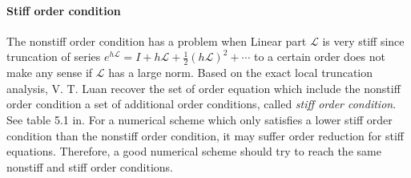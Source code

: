 \paragraph{Stiff order condition} The nonstiff order condition has a problem when
Linear part $\mathcal{L}$ is very stiff since truncation of series
$e^{h\mathcal{L}} = I + h\mathcal{L} + \frac{1}{2}(h\mathcal{L})^2 + \cdots $ to a
certain order does not make any sense if $\mathcal{L}$ has a large norm.
Based on the exact local truncation analysis, V. T. Luan \etal{} recover
the set of order equation which include the nonstiff order condition a set
of additional order conditions, called \emph{stiff order condition}. See table 5.1
in. For a numerical scheme which only satisfies a lower stiff order
condition than the nonstiff order condition, it may suffer order reduction
for stiff equations. Therefore, a good numerical scheme should try to reach
the same nonstiff and stiff order conditions.

